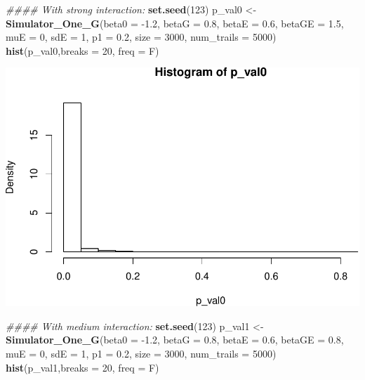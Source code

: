 \documentclass[]{article}
\newenvironment{Shaded}{\begin{snugshade}}{\end{snugshade}}
\newcommand{\CommentTok}[1]{\textcolor[rgb]{0.56,0.35,0.01}{\textit{#1}}}
\newcommand{\DataTypeTok}[1]{\textcolor[rgb]{0.13,0.29,0.53}{#1}}
\newcommand{\DecValTok}[1]{\textcolor[rgb]{0.00,0.00,0.81}{#1}}
\newcommand{\FloatTok}[1]{\textcolor[rgb]{0.00,0.00,0.81}{#1}}
\newcommand{\KeywordTok}[1]{\textcolor[rgb]{0.13,0.29,0.53}{\textbf{#1}}}
\newcommand{\NormalTok}[1]{#1}
\newcommand{\StringTok}[1]{\textcolor[rgb]{0.31,0.60,0.02}{#1}}
\begin{document}
\begin{Shaded}
\begin{Highlighting}[]
\CommentTok{#### With strong interaction:}
\KeywordTok{set.seed}\NormalTok{(}\DecValTok{123}\NormalTok{)}
\NormalTok{p_val0 <-}\StringTok{ }\KeywordTok{Simulator_One_G}\NormalTok{(}\DataTypeTok{beta0 =} \FloatTok{-1.2}\NormalTok{, }\DataTypeTok{betaG =} \FloatTok{0.8}\NormalTok{, }\DataTypeTok{betaE =} \FloatTok{0.6}\NormalTok{, }\DataTypeTok{betaGE =} \FloatTok{1.5}\NormalTok{, }\DataTypeTok{muE =} \DecValTok{0}\NormalTok{, }\DataTypeTok{sdE =} \DecValTok{1}\NormalTok{, }\DataTypeTok{p1 =} \FloatTok{0.2}\NormalTok{, }\DataTypeTok{size =} \DecValTok{3000}\NormalTok{, }\DataTypeTok{num_trails =} \DecValTok{5000}\NormalTok{)}
\KeywordTok{hist}\NormalTok{(p_val0,}\DataTypeTok{breaks =} \DecValTok{20}\NormalTok{, }\DataTypeTok{freq =}\NormalTok{ F)}
\end{Highlighting}
\end{Shaded}

\includegraphics{stats-gene-research-progress-v3_files/figure-latex/unnamed-chunk-1-1.pdf}

\begin{Shaded}
\begin{Highlighting}[]
\CommentTok{#### With medium interaction:}
\KeywordTok{set.seed}\NormalTok{(}\DecValTok{123}\NormalTok{)}
\NormalTok{p_val1 <-}\StringTok{ }\KeywordTok{Simulator_One_G}\NormalTok{(}\DataTypeTok{beta0 =} \FloatTok{-1.2}\NormalTok{, }\DataTypeTok{betaG =} \FloatTok{0.8}\NormalTok{, }\DataTypeTok{betaE =} \FloatTok{0.6}\NormalTok{, }\DataTypeTok{betaGE =} \FloatTok{0.8}\NormalTok{, }\DataTypeTok{muE =} \DecValTok{0}\NormalTok{, }\DataTypeTok{sdE =} \DecValTok{1}\NormalTok{, }\DataTypeTok{p1 =} \FloatTok{0.2}\NormalTok{, }\DataTypeTok{size =} \DecValTok{3000}\NormalTok{, }\DataTypeTok{num_trails =} \DecValTok{5000}\NormalTok{)}
\KeywordTok{hist}\NormalTok{(p_val1,}\DataTypeTok{breaks =} \DecValTok{20}\NormalTok{, }\DataTypeTok{freq =}\NormalTok{ F)}
\end{Highlighting}
\end{Shaded}
\end{document}
